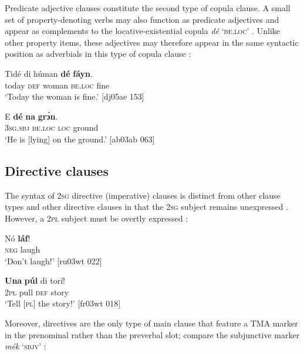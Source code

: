 Predicate adjective clauses constitute the second type of copula clause. A small set of property-denoting verbs may also function as predicate adjectives and appear as complements to the locative-existential copula \textit{dé} \textsc{‘be.loc’} . Unlike other property items, these adjectives may therefore appear in the same syntactic position as adverbials in this type of copula clause : 


\ea%
    \label{ex:key:526}
    \gll Tidé    di  húman  \textbf{dé}   \textbf{fáyn}.\\
today  \textsc{def}  woman  \textsc{be.loc}  fine\\

\glt ‘Today the woman is fine.’ [dj05ae 153]
\z


\ea%
    \label{ex:key:527}
    \gll E    \textbf{dé}    \textbf{na} \textbf{grɔ́n}.\\
\textsc{3sg.sbj}  \textsc{be.loc}  \textsc{loc}  ground\\

\glt ‘He is [lying] on the ground.’ [ab03ab 063]
\z

\subsection{Directive clauses}

The syntax of \textsc{2sg} directive (imperative) clauses is distinct from other clause types and other directive clauses in that the \textsc{2sg} subject remains unexpressed . However, a \textsc{2pl} subject must be overtly expressed :


\ea%
    \label{ex:key:528}
    \gll Nó  \textbf{láf}!\\
\textsc{neg}  laugh\\

\glt ‘Don’t laugh!’ [ru03wt 022]
\z


\ea%
    \label{ex:key:529}
    \gll \textbf{Una}    \textbf{púl} di  torí!\\
\textsc{2pl}    pull  \textsc{def}  story\\

\glt ‘Tell \textsc{[pl]} the story!’ [fr03wt 018]
\z

Moreover, directives are the only type of main clause that feature a TMA marker in the prenominal rather than the preverbal slot; compare the subjunctive marker \textit{mék} ‘\textsc{sbjv}’ :


